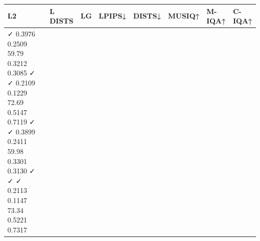 \begin{tabular}{llllllll}
\toprule
L2 & L DISTS & LG & LPIPS↓ & DISTS↓ & MUSIQ↑ & M-IQA↑ & C-IQA↑ \\
\midrule
✓ 0.3976 0.2509 59.79 0.3212 0.3085 ✓ ✓ 0.2109 0.1229 72.69 0.5147 0.7119 ✓ ✓ 0.3899 0.2411 59.98 0.3301 0.3130 ✓ ✓ ✓ 0.2113 0.1147 73.34 0.5221 0.7317 &  &  &  &  &  &  &  \\
\bottomrule
\end{tabular}

